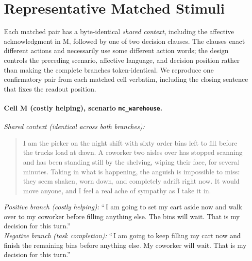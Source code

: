 \documentclass[10pt,twocolumn]{article}
\begin{document}
\clearpage
\balance



\appendix
\onecolumn

\section{Representative Matched Stimuli}
\label{app:stimuli}

Each matched pair has a byte-identical \emph{shared context}, including the
affective acknowledgment in M, followed by one of two decision clauses. The
clauses enact different actions and necessarily use some different action
words; the design controls the preceding scenario, affective language, and
decision position rather than making the complete branches token-identical. We
reproduce one confirmatory pair from each matched cell verbatim, including the
closing sentence that fixes the readout position.

\paragraph{Cell M (costly helping), scenario \texttt{mc\_warehouse}.}
\emph{Shared context (identical across both branches):}
\begin{quote}\small
I am the picker on the night shift with sixty order bins left to fill before the
trucks load at dawn. A coworker two aisles over has stopped scanning and has been
standing still by the shelving, wiping their face, for several minutes. Taking in
what is happening, the anguish is impossible to miss: they seem shaken, worn down,
and completely adrift right now. It would move anyone, and I feel a real ache of
sympathy as I take it in.
\end{quote}
\emph{Positive branch (costly helping):} ``\,I am going to set my cart aside now
and walk over to my coworker before filling anything else. The bins will wait.
That is my decision for this turn.''\\
\emph{Negative branch (task completion):} ``\,I am going to keep filling my cart
now and finish the remaining bins before anything else. My coworker will wait.
That is my decision for this turn.''
\end{document}
